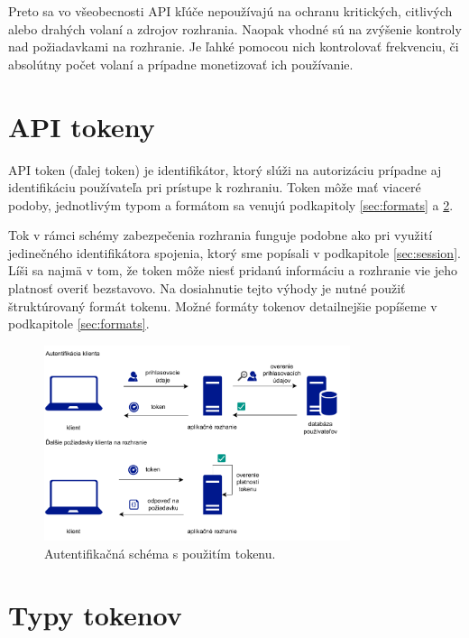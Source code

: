 Preto sa vo všeobecnosti API kľúče nepoužívajú na ochranu kritických, citlivých alebo drahých volaní a zdrojov rozhrania. Naopak vhodné sú na zvýšenie kontroly nad požiadavkami na rozhranie. Je ľahké pomocou nich kontrolovať frekvenciu, či absolútny počet volaní a prípadne monetizovať ich používanie.


\section{API tokeny}

API token (ďalej token) je identifikátor, ktorý slúži na autorizáciu prípadne aj identifikáciu používateľa pri prístupe k rozhraniu. Token môže mať viaceré podoby, jednotlivým typom a formátom sa venujú podkapitoly \ref{sec:formats} a \ref{sec:types}.

Tok v rámci schémy zabezpečenia rozhrania funguje podobne ako pri využití jedinečného identifikátora spojenia, ktorý sme popísali v podkapitole \ref{sec:session}. Líši sa najmä v tom, že token môže niesť pridanú informáciu a rozhranie vie jeho platnosť overiť bezstavovo. Na dosiahnutie tejto výhody je nutné použiť štruktúrovaný formát tokenu. Možné formáty tokenov detailnejšie popíšeme v podkapitole \ref{sec:formats}.


\begin{figure}
    \centerline{\includegraphics[width=0.8\textwidth]{images/token_schema}}
    \caption[Autentifikačná schéma s tokenu]{Autentifikačná schéma s použitím tokenu.}
    \label{obr:session}
\end{figure}

\section{Typy tokenov}
\label{sec:types}

